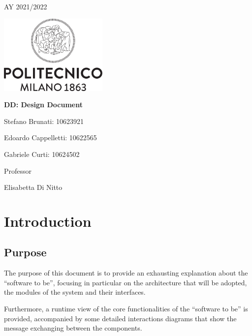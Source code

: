 \documentclass{article}
\begin{document}
\begin{titlepage}
    \centering
    {\scshape\large AY 2021/2022 \par}
    \vfill
    \includegraphics[width=150pt]{images/Logo_Politecnico_Milano.png}\par\vspace{1cm}
    \vspace{1.5cm}
    {\huge\bfseries DD\@: Design Document \par}
    \vspace{2cm}
    {\Large {Stefano Brunati: 10623921\par}}
    {\Large {Edoardo Cappelletti: 10622565\par}}
    {\Large {Gabriele Curti: 10624502\par}}
    \vfill
    {\large Professor\par Elisabetta Di Nitto}
    \vfill
\end{titlepage}

\newpage

\setlength{\parskip}{0em}
\tableofcontents 

\newpage



\setlength{\parskip}{1em}


\section{Introduction}

\subsection{Purpose}

The purpose of this document is to provide an exhausting explanation about the “software to be”, focusing in particular on the architecture that will be adopted, the modules of the system and their interfaces. \par

Furthermore, a runtime view of the core functionalities of the “software to be” is provided, accompanied by some detailed interactions diagrams that show the message exchanging between the components. \par
\end{document}
